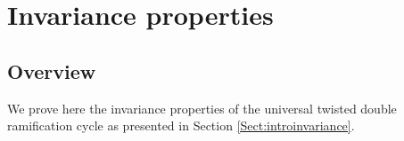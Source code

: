 \documentclass[a4paper,12pt]{article} %
\newcommand{\ca}[1]{{\mathcal{#1}}}
\theoremstyle{definition}
\theoremstyle{plain}%
\begin{document}
%
%
%
%
%
%




\section{Invariance properties} \label{Sect:proofInvariance}
\subsection{Overview}
We prove here the invariance properties of the universal twisted double ramification cycle as presented in Section \ref{Sect:introinvariance}. 
\end{document}
